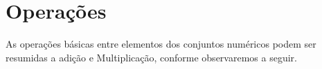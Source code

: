 \section{Operações}

As operações básicas entre elementos dos conjuntos numéricos podem ser resumidas a adição e Multiplicação, conforme observaremos a seguir.


